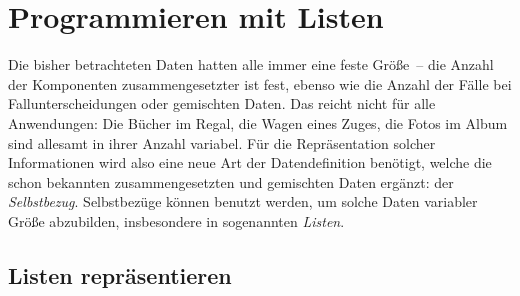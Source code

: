 
\chapter{Programmieren mit Listen}
\label{cha:rek}

Die bisher betrachteten Daten hatten alle immer eine feste Größe~--
die Anzahl der Komponenten zusammengesetzter ist fest, ebenso wie die
Anzahl der Fälle bei Fallunterscheidungen oder gemischten Daten.  Das
reicht nicht für alle Anwendungen: Die Bücher im Regal, die Wagen
eines Zuges, die Fotos im Album sind allesamt in ihrer Anzahl
variabel.  Für die Repräsentation solcher Informationen wird also eine
neue Art der Datendefinition benötigt, welche die schon bekannten
zusammengesetzten und gemischten Daten ergänzt: der
\textit{Selbstbezug}.  Selbstbezüge können benutzt werden, um solche
Daten variabler Größe abzubilden, insbesondere in sogenannten
\textit{Listen}.

\section{Listen repräsentieren}
\label{sec:lists}

